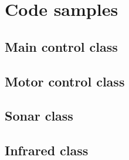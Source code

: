 \chapter{Code samples}

\section{Main control class}

%

\section{Motor control class}
%

\section{Sonar class}
%

\section{Infrared class}
%
